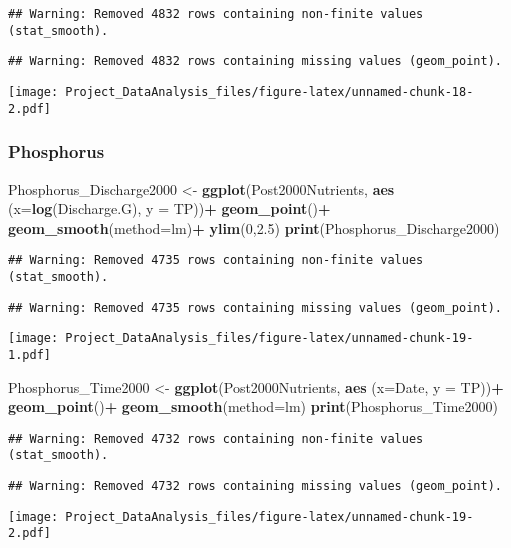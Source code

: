 \documentclass[]{article}
\newenvironment{Shaded}{\begin{snugshade}}{\end{snugshade}}
\newcommand{\DataTypeTok}[1]{\textcolor[rgb]{0.13,0.29,0.53}{#1}}
\newcommand{\DecValTok}[1]{\textcolor[rgb]{0.00,0.00,0.81}{#1}}
\newcommand{\FloatTok}[1]{\textcolor[rgb]{0.00,0.00,0.81}{#1}}
\newcommand{\KeywordTok}[1]{\textcolor[rgb]{0.13,0.29,0.53}{\textbf{#1}}}
\newcommand{\NormalTok}[1]{#1}
\newcommand{\OperatorTok}[1]{\textcolor[rgb]{0.81,0.36,0.00}{\textbf{#1}}}
\newcommand{\StringTok}[1]{\textcolor[rgb]{0.31,0.60,0.02}{#1}}
\begin{document}
\begin{verbatim}
## Warning: Removed 4832 rows containing non-finite values (stat_smooth).
\end{verbatim}

\begin{verbatim}
## Warning: Removed 4832 rows containing missing values (geom_point).
\end{verbatim}

\texttt{[image: Project\_DataAnalysis\_files/figure-latex/unnamed-chunk-18-2.pdf]}

\hypertarget{phosphorus-4}{%
\subsubsection{Phosphorus}\label{phosphorus-4}}

\begin{Shaded}
\begin{Highlighting}[]
\NormalTok{Phosphorus_Discharge2000 <-}\StringTok{ }
\StringTok{  }\KeywordTok{ggplot}\NormalTok{(Post2000Nutrients, }\KeywordTok{aes}\NormalTok{ (}\DataTypeTok{x=}\KeywordTok{log}\NormalTok{(Discharge.G), }\DataTypeTok{y =}\NormalTok{ TP))}\OperatorTok{+}
\StringTok{  }\KeywordTok{geom_point}\NormalTok{()}\OperatorTok{+}
\StringTok{  }\KeywordTok{geom_smooth}\NormalTok{(}\DataTypeTok{method=}\NormalTok{lm)}\OperatorTok{+}
\StringTok{  }\KeywordTok{ylim}\NormalTok{(}\DecValTok{0}\NormalTok{,}\FloatTok{2.5}\NormalTok{)}
\KeywordTok{print}\NormalTok{(Phosphorus_Discharge2000)}
\end{Highlighting}
\end{Shaded}

\begin{verbatim}
## Warning: Removed 4735 rows containing non-finite values (stat_smooth).
\end{verbatim}

\begin{verbatim}
## Warning: Removed 4735 rows containing missing values (geom_point).
\end{verbatim}

\texttt{[image: Project\_DataAnalysis\_files/figure-latex/unnamed-chunk-19-1.pdf]}

\begin{Shaded}
\begin{Highlighting}[]
\NormalTok{Phosphorus_Time2000 <-}\StringTok{ }
\StringTok{  }\KeywordTok{ggplot}\NormalTok{(Post2000Nutrients, }\KeywordTok{aes}\NormalTok{ (}\DataTypeTok{x=}\NormalTok{Date, }\DataTypeTok{y =}\NormalTok{ TP))}\OperatorTok{+}
\StringTok{  }\KeywordTok{geom_point}\NormalTok{()}\OperatorTok{+}
\StringTok{  }\KeywordTok{geom_smooth}\NormalTok{(}\DataTypeTok{method=}\NormalTok{lm)}
\KeywordTok{print}\NormalTok{(Phosphorus_Time2000)}
\end{Highlighting}
\end{Shaded}

\begin{verbatim}
## Warning: Removed 4732 rows containing non-finite values (stat_smooth).
\end{verbatim}

\begin{verbatim}
## Warning: Removed 4732 rows containing missing values (geom_point).
\end{verbatim}

\texttt{[image: Project\_DataAnalysis\_files/figure-latex/unnamed-chunk-19-2.pdf]}
\end{document}
